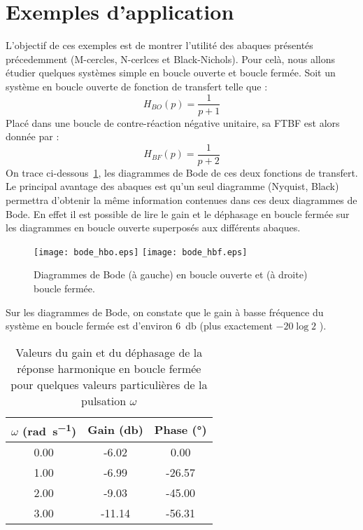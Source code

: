 \section{Exemples d'application}\label{exemples-dapplication}
L'objectif de ces exemples est de montrer l'utilité des abaques présentés 
précedemment (M-cercles, N-cerlces et Black-Nichols). Pour celà, nous allons 
étudier quelques systèmes simple en boucle ouverte et boucle fermée.
Soit un système en boucle ouverte de fonction de transfert telle que :
\[
    H_{BO}(p)=\dfrac{1}{p+1}
\]
Placé dans une boucle de contre-réaction négative unitaire, sa FTBF est alors
donnée par :
\[
    H_{BF}(p)=\dfrac{1}{p+2}
\]
On trace ci-dessous~\cref{fig-exemple1_bodeBlackNichols}, les diagrammes de 
Bode de ces deux fonctions de transfert. Le principal avantage des abaques est 
qu'un seul diagramme (Nyquist, Black) 
permettra d'obtenir la même information contenues dans ces deux 
diagrammes de Bode.
En effet il est possible de lire le gain et le déphasage en boucle fermée
sur les diagrammes en boucle ouverte superposés aux différents abaques.
\begin{figure}[!h]
    \centering
    \texttt{[image: bode\_hbo.eps]}
    \texttt{[image: bode\_hbf.eps]}
    \caption{Diagrammes de Bode (à gauche) en boucle ouverte et (à droite) 
    boucle fermée.\label{fig-exemple1_bodeBlackNichols}}
\end{figure}
Sur les diagrammes de Bode, on constate que le gain à basse fréquence du 
système en boucle fermée est d'environ \SI{6}{\decibel} 
(plus exactement $-20\log{2}$ ). 
\begin{table}
    \centering
    \begin{tabular}{ccc}
    \hline
        $\omega$ (\si{\radian\per\second}) & 
                      Gain (\si{\decibel}) & Phase (\si{\degree})\\
    \hline
    0.00 & -6.02 & 0.00\\
    1.00 & -6.99 & -26.57\\
    2.00 & -9.03 & -45.00\\
    3.00 & -11.14 & -56.31\\
    \hline
    \end{tabular}
    \caption{Valeurs du gain et du déphasage de la réponse harmonique
            en boucle fermée pour quelques valeurs particulières de la pulsation
            $\omega$}
\end{table}
